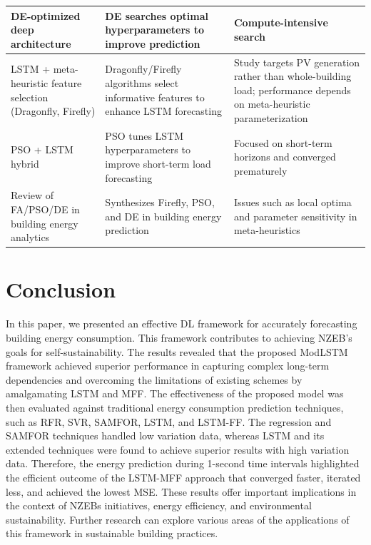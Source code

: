 \documentclass[journal]{IEEEtran}
\begin{document}
\begin{table}
\begin{tabular}{|p{4.5cm}|p{5.2cm}|p{5.2cm}|}
DE-optimized deep architecture \cite{RC58} & DE searches optimal hyperparameters to improve prediction & Compute-intensive search\\ \hline

LSTM + meta-heuristic feature selection (Dragonfly, Firefly) \cite{RC57} & Dragonfly/Firefly algorithms select informative features to enhance LSTM forecasting & Study targets PV generation rather than whole-building load; performance depends on meta-heuristic parameterization  \\ \hline

PSO + LSTM hybrid \cite{RC56} & PSO tunes LSTM hyperparameters to improve short-term load forecasting & Focused on short-term horizons and converged prematurely  \\ \hline

Review of FA/PSO/DE in building energy analytics \cite{RC55} & Synthesizes Firefly, PSO, and DE in building energy prediction  & Issues such as local optima and parameter sensitivity in meta-heuristics \\ \hline







\end{tabular}
\end{table}






\section{Conclusion} \label{Conclusion}
In this paper, we presented an effective DL framework for accurately forecasting building energy consumption. This framework contributes to achieving NZEB's goals for self-sustainability. The results revealed that the proposed ModLSTM framework achieved superior performance in capturing complex long-term dependencies and overcoming the limitations of existing schemes by amalgamating LSTM and MFF. The effectiveness of the proposed model was then evaluated against traditional energy consumption prediction techniques, such as RFR, SVR, SAMFOR, LSTM, and LSTM-FF. The regression and SAMFOR techniques handled low variation data, whereas LSTM and its extended techniques were found to achieve superior results with high variation data. Therefore, the energy prediction during 1-second time intervals highlighted the efficient outcome of the LSTM-MFF approach that converged faster, iterated less, and achieved the lowest MSE. These results offer important implications in the context of NZEBs initiatives, energy efficiency, and environmental sustainability. Further research can explore various areas of the applications of this framework in sustainable building practices. 
\end{document}
